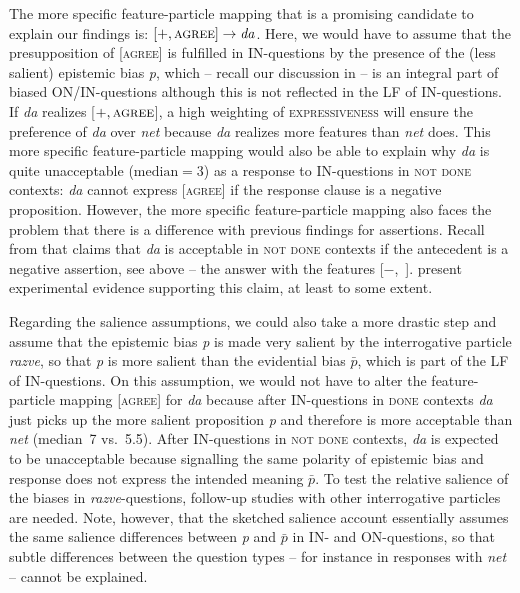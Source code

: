 \documentclass[output=paper,colorlinks,citecolor=brown]{langscibook}
\begin{document}
The more specific feature-particle mapping that is a promising candidate to explain our findings is: $[+,\textsc{agree}]\rightarrow\textit{da}$. Here, we would have to assume that the presupposition of [\textsc{agree}] is fulfilled in IN-questions by the presence of the (less salient) epistemic bias \textit{p}, which -- recall our discussion in  -- is an integral part of biased ON/IN-questions although this is not reflected in the LF of IN-questions. If \textit{da} realizes [$+,\textsc{agree}$], a high weighting of \textsc{expressiveness} will ensure the preference of \textit{da} over \textit{net} because \textit{da} realizes more features than \textit{net} does. This more specific feature-particle mapping would also be able to explain why \textit{da} is quite unacceptable ($\text{median}=3$) as a response to IN-questions in \textsc{not done} contexts: \textit{da} cannot express [\textsc{agree}] if the response clause is a negative proposition. However, the more specific feature-particle mapping also faces the problem that there is a difference with previous findings for assertions. Recall from  that \citet{Esipova2021} claims that \textit{da} is acceptable in \textsc{not done} contexts if the antecedent is a negative assertion, see  above -- the answer with the features [$-$, \,]. \citet{ReppGeist2022} present experimental evidence supporting this claim, at least to some extent.

Regarding the salience assumptions, we could also take a more drastic step and assume that the epistemic bias \textit{p} is made very salient by the interrogative particle \textit{razve}, so that \textit{p} is more salient than the evidential bias $\bar{p}$, which is part of the LF of IN-questions. On this assumption, we would not have to alter the feature-particle mapping [\textsc{agree}] for \textit{da} because after IN-questions in \textsc{done} contexts \textit{da} just picks up the more salient proposition \textit{p} and therefore is more acceptable than \textit{net} (median~7 vs.~5.5). After IN-questions in \textsc{not done} contexts, \textit{da} is expected to be unacceptable because signalling the same polarity of epistemic bias and response does not express the intended meaning $\bar{p}$. To test the relative salience of the biases in \textit{razve}-questions, follow-up studies with other interrogative particles are needed. Note, however, that the sketched salience account essentially assumes the same salience differences between \textit{p} and $\bar{p}$ in IN- and ON-questions, so that subtle differences between the question types -- for instance in responses with \textit{net} -- cannot be explained.
\end{document}

